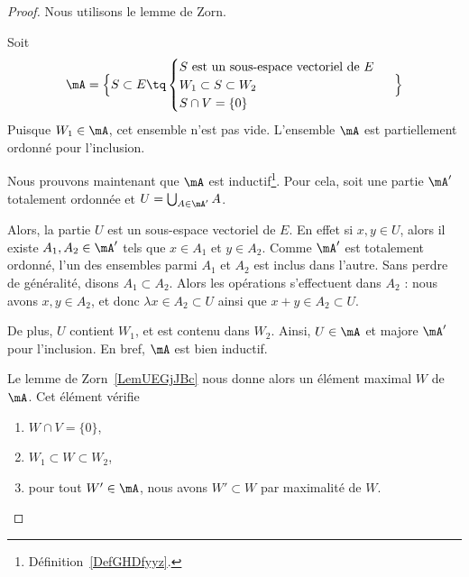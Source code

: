 \begin{proof}
	Nous utilisons le lemme de Zorn.
	\begin{subproof}
		Soit
		\begin{equation}
			\mA=\Big\{   S\subset E\tq \begin{cases}
				S    \text{ est un sous-espace vectoriel de \( E\) } \\
				W_1\subset S\subset W_2                              \\
				S\cap V=\{ 0 \}
			\end{cases}\Big\}
		\end{equation}
		Puisque \( W_1\in \mA\), cet ensemble n'est pas vide.
		\spitem[Ordre]
		L'ensemble \( \mA\) est partiellement ordonné pour l'inclusion.

		Nous prouvons maintenant que \( \mA\) est inductif\footnote{Définition~\ref{DefGHDfyyz}.}. Pour cela, soit une partie \( \mA'\) totalement ordonnée et \( U=\bigcup_{A\in \mA'}A\).

		Alors, la partie \( U\) est un sous-espace vectoriel de \( E\). En effet si \( x,y\in U\), alors il existe \( A_1,A_2\in\mA'\) tels que \( x\in A_1\) et \( y\in A_2\). Comme \( \mA'\) est totalement ordonné, l'un des ensembles parmi \( A_1\) et \( A_2\) est inclus dans l'autre. Sans perdre de généralité, disons \( A_1\subset A_2\). Alors les opérations s'effectuent dans \( A_2 \) : nous avons \( x,y\in A_2\), et donc \( \lambda x\in A_2\subset U\) ainsi que \( x+y\in A_2\subset U\).

		De plus, \( U \) contient \( W_1 \), et est contenu dans \( W_2\). Ainsi, \( U\in \mA\) et majore \( \mA'\) pour l'inclusion. En bref, \( \mA\) est bien inductif.

		Le lemme de Zorn~\ref{LemUEGjJBc} nous donne alors un élément maximal \( W\) de \( \mA\). Cet élément vérifie
		\begin{enumerate}
			\item
			      \( W\cap V=\{ 0 \}\),
			\item
			      \( W_1\subset W\subset W_2\),
			\item
			      pour tout \( W'\in\mA\), nous avons \( W'\subset W\) par maximalité de \( W\).
		\end{enumerate}


\end{subproof}
\end{proof}
